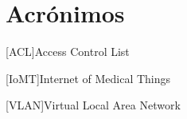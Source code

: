 \chapter{Acrónimos} %
%
%
\begin{acronym}

[ACL]{Access Control List}

[IoMT]{Internet of Medical Things}

[VLAN]{Virtual Local Area Network}

\end{acronym}
